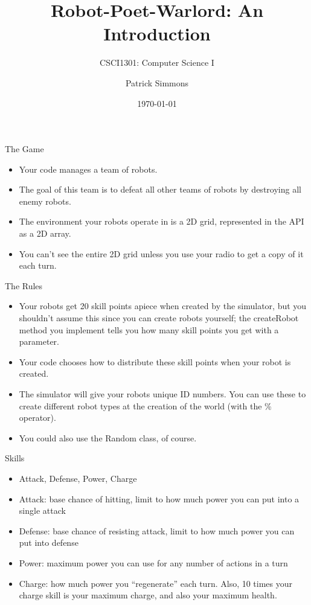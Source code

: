 \documentclass[aspectratio=169]{beamer}
\begin{document}
\title{Robot-Poet-Warlord: An Introduction}
\subtitle{CSCI1301: Computer Science I}
\author{Patrick Simmons}
\date{\today}

\begin{frame}
  \titlepage
\end{frame}

\begin{frame}{The Game}
  \begin{itemize}
   \item Your code manages a team of robots.
   \item The goal of this team is to defeat all other teams of robots
     by destroying all enemy robots.
   \item The environment your robots operate in is a 2D grid,
     represented in the API as a 2D array.
   \item You can't see the entire 2D grid unless you use your radio to
     get a copy of it each turn.
  \end{itemize}
\end{frame}

\begin{frame}{The Rules}
  \begin{itemize}
   \item Your robots get 20 skill points apiece when created by the
     simulator, but you shouldn't assume this since you can create
     robots yourself; the createRobot method you implement tells you
     how many skill points you get with a parameter.
   \item Your code chooses how to distribute these skill points when
     your robot is created.
   \item The simulator will give your robots unique ID numbers.  You
     can use these to create different robot types at the creation of
     the world (with the \% operator).
   \item You could also use the Random class, of course.
  \end{itemize}
\end{frame}

\begin{frame}{Skills}
  \begin{itemize}
   \item Attack, Defense, Power, Charge
   \item Attack: base chance of hitting, limit to how much power you
     can put into a single attack
   \item Defense: base chance of resisting attack, limit to how much
     power you can put into defense
   \item Power: maximum power you can use for any number of actions
     in a turn
   \item Charge: how much power you ``regenerate'' each turn.  Also,
     10 times your charge skill is your maximum charge, and also your
     maximum health.
  \end{itemize}
\end{frame}
\end{document}
